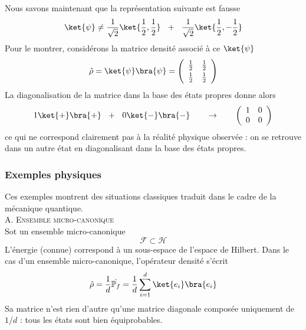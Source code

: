 Nous savons maintenant que la représentation suivante est fausse
\begin{equation}
\ket{\psi} \neq \dfrac{1}{\sqrt{2}}\ket{\frac{1}{2},\frac{1}{2}}\ \ +\ \ \dfrac{1}{\sqrt{2}}\ket{\frac{1}{2},-\frac{1}{2}}
\end{equation}
Pour le montrer, considérons la matrice densité associé à ce $\ket{\psi}$
\begin{equation}
\hat{\rho} = \ket{\psi}\bra{\psi} = \left(\begin{array}{cc}
\frac{1}{2} & \frac{1}{2}\vspace{1mm}\\
\frac{1}{2} & \frac{1}{2}
\end{array}\right)
\end{equation}
La diagonalisation de la matrice dans la base des états propres donne alors
\begin{equation}
1\ket{+}\bra{+} \ \ +\ \  0\ket{-}\bra{-}\qquad\rightarrow\qquad \left(\begin{array}{cc}
1&0\\
0&0
\end{array}\right)
\end{equation}
ce qui ne correspond clairement pas à la réalité physique observée : on se retrouve dans un autre état en diagonalisant 
dans la base des états propres.

\subsubsection{Exemples physiques}
Ces exemples montrent des situations classiques traduit dans le cadre de la mécanique quantique.\\

\textsc{A. Ensemble micro-canonique}\\
Sot un ensemble micro-canonique
\begin{equation}
\mathcal{F}\subset\mathcal{H}
\end{equation}
L'énergie (connue) correspond à un sous-espace de l'espace de Hilbert. Dans le cas d'un ensemble micro-canonique, 
l'opérateur densité s'écrit
\begin{equation}
\hat{\rho} = \frac{1}{d}\hat{\mathbb{P}_f} = \frac{1}{d}\sum_{i=1}^d \ket{e_i}\bra{e_i}
\end{equation}
Sa matrice n'est rien d'autre qu'une matrice diagonale composée uniquement de $1/d$ : tous les états sont bien 
équiprobables.\\

